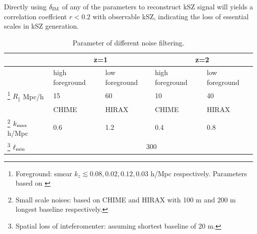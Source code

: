 Directly using $\delta_\mathrm{IM}$ of any of the parameters 
to reconstruct kSZ signal will 
yields a correlation coeffcient $r<0.2$ 
with observable kSZ, 
indicating the loss of essential scales in kSZ generation.


\begin{table}
\begin{tabular}{|m{2cm}|m{1.5cm}|m{1.5cm}|m{1.5cm}|m{1.5cm}|}
    \hline
     & \multicolumn{2}{|c|}{z=1} &\multicolumn{2}{|c|}{z=2}\\
     \hline
     & high foreground &low foreground&high foreground& low foreground\\
     \cline{2-5}
     \footnote{Foreground: smear $k_z\lesssim 0.08,0.02,0.12,0.03$ h/Mpc respectively. Parameters based on \cite{2013ApJ...763L..20M,Switzer13,15Shaw}}
     $R_\parallel$ Mpc/h
      & 15 & 60 & 10 & 40 \\
     \hline
     & CHIME & HIRAX & CHIME &HIRAX\\
     \cline{2-5}
     \footnote{Small scale noises: based on CHIME\cite{2014CHIME} and HIRAX\cite{HIRAX} 
     with 100 m and 200 m longest baseline respectively.}
     $k_\mathrm{max}$ h/Mpc 
     & 0.6 & 1.2 & 0.4 & 0.8 \\
     \hline
     \footnote{Spatial loss of inteferomenter: assuming shortest baseline of 20 m.}
     $\ell_\mathrm{min}$
     & \multicolumn{4}{|c|}{300} \\
     \hline
\end{tabular}
     \caption{Parameter of different noise filtering.}
     \label{tab:para}
\end{table}

